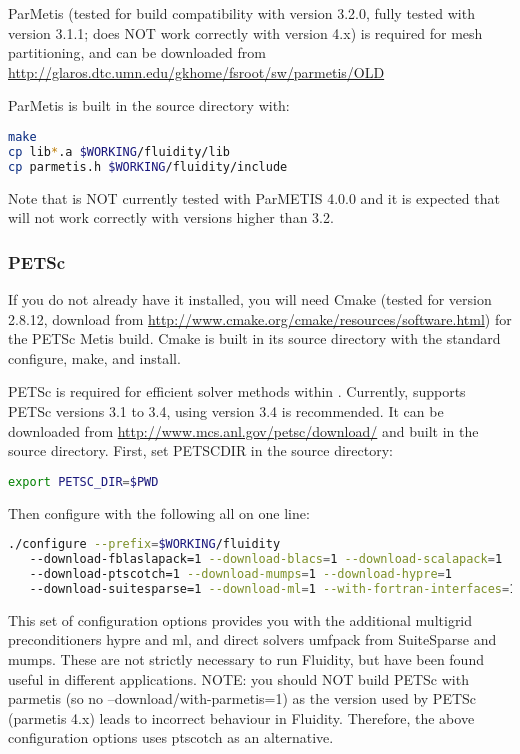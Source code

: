 ParMetis (tested for \fluidity build compatibility with version 3.2.0, fully
tested with version 3.1.1; \fluidity does NOT work correctly with version 4.x) is required for mesh
partitioning, and can be downloaded from
\url{http://glaros.dtc.umn.edu/gkhome/fsroot/sw/parmetis/OLD}

ParMetis is built in the source directory with:

\begin{lstlisting}[language=bash]
make
cp lib*.a $WORKING/fluidity/lib
cp parmetis.h $WORKING/fluidity/include
\end{lstlisting}

Note that \fluidity is NOT currently tested with ParMETIS 4.0.0 and it is
expected that \fluidity will not work correctly with versions higher than 3.2.

\subsubsection{PETSc}
\label{sec:required_libraries_numerical_petsc}

If you do not already have it installed, you will need Cmake (tested for
version 2.8.12, download from
\url{http://www.cmake.org/cmake/resources/software.html}) for the PETSc Metis
build.  Cmake is built in its source directory with the standard configure,
make, and install.

PETSc is required for
efficient solver methods within \fluidity. Currently,
\fluidity supports PETSc versions 3.1 to 3.4, using version 3.4
is recommended. It can be downloaded from
\url{http://www.mcs.anl.gov/petsc/download/} and built in the source directory.
First, set PETSC{\textunderscore}DIR in the source directory:

\begin{lstlisting}[language=bash]
export PETSC_DIR=$PWD
\end{lstlisting}

Then configure with the following all on one line:

\begin{lstlisting}[language=bash]
./configure --prefix=$WORKING/fluidity 
   --download-fblaslapack=1 --download-blacs=1 --download-scalapack=1 
   --download-ptscotch=1 --download-mumps=1 --download-hypre=1
   --download-suitesparse=1 --download-ml=1 --with-fortran-interfaces=1
\end{lstlisting}

This set of configuration options provides you with the additional
multigrid preconditioners hypre and ml, and direct solvers umfpack 
from SuiteSparse and mumps. These are not strictly necessary to run
Fluidity, but have been found useful in different applications. NOTE:
you should NOT build PETSc with parmetis
(so no --download/with-parmetis=1) as the version used by PETSc 
(parmetis 4.x) leads to incorrect behaviour in Fluidity. Therefore, the above
configuration options uses ptscotch as an alternative.

